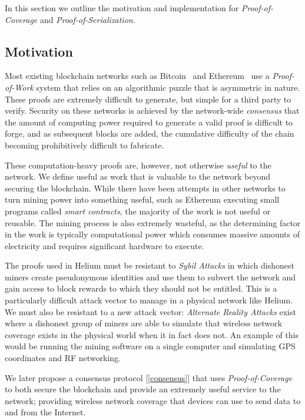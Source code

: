 \documentclass[10pt, nonatbib, nocopyrightspace, reprint]{sigplanconf}
\newcommand{\secref}[1]{[\autoref{#1}]}
\begin{document}
In this section we outline the motivation and implementation for \emph{Proof-of-Coverage} and \emph{Proof-of-Serialization}.

\subsection{Motivation}

Most existing blockchain networks such as Bitcoin~\cite{bitcoin} and Ethereum~\cite{ethereum} use a \emph{Proof-of-Work} system that relies on an algorithmic puzzle that is asymmetric in nature. These proofs are extremely difficult to generate, but simple for a third party to verify. Security on these networks is achieved by the network-wide \emph{consensus} that the amount of computing power required to generate a valid proof is difficult to forge, and as subsequent blocks are added, the cumulative difficulty of the chain becoming prohibitively difficult to fabricate.

These computation-heavy proofs are, however, not otherwise \emph{useful} to the network. We define useful as work that is valuable to the network beyond securing the blockchain. While there have been attempts in other networks to turn mining power into something useful, such as Ethereum executing small programs called \emph{smart contracts}, the majority of the work is not useful or reusable. The mining process is also extremely wasteful, as the determining factor in the work is typically computational power which consumes massive amounts of electricity and requires significant hardware to execute.

The proofs used in Helium must be resistant to \emph{Sybil Attacks} in which dishonest miners create pseudonymous identities and use them to subvert the network and gain access to block rewards to which they should not be entitled. This is a particularly difficult attack vector to manage in a physical network like Helium. We must also be resistant to a new attack vector: \emph{Alternate Reality Attacks} exist where a dishonest group of miners are able to simulate that wireless network coverage exists in the physical world when it in fact does not. An example of this would be running the mining software on a single computer and simulating GPS coordinates and RF networking.

We later propose a consensus protocol \secref{consensus} that uses \emph{Proof-of-Coverage} to both secure the blockchain and provide an extremely useful service to the network; providing wireless network coverage that devices can use to send data to and from the Internet.
\end{document}
